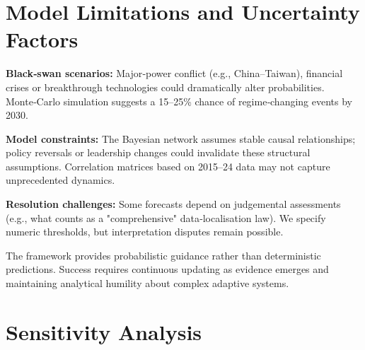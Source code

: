 \documentclass{article}
\begin{document}
\section{Model Limitations and Uncertainty Factors}

\textbf{Black‑swan scenarios:} Major‑power conflict (e.g., China–Taiwan), financial crises or breakthrough technologies could dramatically alter probabilities.  Monte‑Carlo simulation suggests a 15–25\% chance of regime‑changing events by 2030.

\textbf{Model constraints:} The Bayesian network assumes stable causal relationships; policy reversals or leadership changes could invalidate these structural assumptions.  Correlation matrices based on 2015–24 data may not capture unprecedented dynamics.

\textbf{Resolution challenges:} Some forecasts depend on judgemental assessments (e.g., what counts as a "comprehensive" data‑localisation law).  We specify numeric thresholds, but interpretation disputes remain possible.

The framework provides probabilistic guidance rather than deterministic predictions.  Success requires continuous updating as evidence emerges and maintaining analytical humility about complex adaptive systems.

\section{Sensitivity Analysis}



\pagebreak
\end{document}
